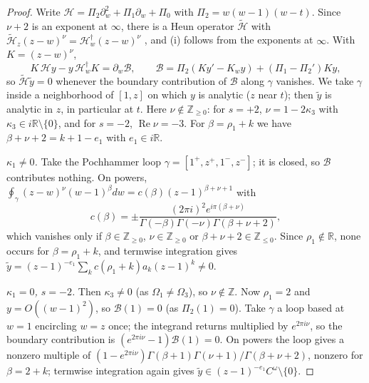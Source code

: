 \documentclass[11pt]{amsart}
\theoremstyle{definition}
\theoremstyle{remark}
\numberwithin{equation}{section}
\newcommand{\R}{\mathbb{R}}
\newcommand{\Z}{\mathbb{Z}}
\renewcommand{\Re}{\operatorname{Re}}
\begin{document}
\begin{proof}
Write $\mathcal H=\Pi_2\partial_w^2+\Pi_1\partial_w+\Pi_0$ with $\Pi_2=w(w-1)(w-t)$. Since $\nu+2$ is an exponent at $\infty$, there
is a Heun operator $\widetilde{\mathcal H}$ with $\widetilde{\mathcal H}_z(z-w)^\nu=\mathcal H_w^\dagger(z-w)^\nu$
\cite{KS96,Tak03}, and (i) follows from the exponents at $\infty$. With $K=(z-w)^\nu$,
\[
K\,\mathcal Hy-y\,\mathcal H_w^\dagger K=\partial_w\mathcal B,\qquad\mathcal B=\Pi_2(Ky'-K_wy)+(\Pi_1-\Pi_2')Ky,
\]
so $\widetilde{\mathcal H}\tilde y=0$ whenever the boundary contribution of $\mathcal B$ along $\gamma$ vanishes. We
take $\gamma$ inside a neighborhood of $[1,z]$ on which $y$ is analytic ($z$ near $t$); then $\tilde y$ is analytic in
$z$, in particular at $t$. Here $\nu\notin\Z_{\ge0}$: for $s=+2$, $\nu=1-2\kappa_3$ with
$\kappa_3\in i\R\setminus\{0\}$, and for $s=-2$, $\Re\nu=-3$. For $\beta=\rho_1+k$ we have $\beta+\nu+2=k+1-e_1$ with
$e_1\in i\R$.

\emph{$\kappa_1\ne0$.} Take the Pochhammer loop $\gamma=[1^+,z^+,1^-,z^-]$; it is closed, so $\mathcal B$ contributes
nothing. On powers, $\oint_\gamma(z-w)^\nu(w-1)^\beta dw=c(\beta)(z-1)^{\beta+\nu+1}$ with
\[
c(\beta)=\pm\frac{(2\pi i)^2e^{i\pi(\beta+\nu)}}{\Gamma(-\beta)\Gamma(-\nu)\Gamma(\beta+\nu+2)},
\]
which vanishes only if
$\beta\in\Z_{\ge0}$, $\nu\in\Z_{\ge0}$ or $\beta+\nu+2\in\Z_{\le0}$. Since $\rho_1\notin\R$, none occurs for
$\beta=\rho_1+k$, and termwise integration gives $\tilde y=(z-1)^{-e_1}\sum_kc(\rho_1+k)a_k(z-1)^k\ne0$.

\emph{$\kappa_1=0$, $s=-2$.} Then $\kappa_3\ne0$ (as $\Omega_1\ne\Omega_3$), so $\nu\notin\Z$. Now $\rho_1=2$ and $y=O((w-1)^2)$, so $\mathcal B(1)=0$ (as $\Pi_2(1)=0$). Take $\gamma$ a
loop based at $w=1$ encircling $w=z$ once; the integrand returns multiplied by $e^{2\pi i\nu}$, so the boundary
contribution is $(e^{2\pi i\nu}-1)\mathcal B(1)=0$. On powers the loop gives a nonzero multiple of
$(1-e^{2\pi i\nu})\Gamma(\beta+1)\Gamma(\nu+1)/\Gamma(\beta+\nu+2)$, nonzero for $\beta=2+k$; termwise integration again
gives $\tilde y\in(z-1)^{-e_1}C^\omega\setminus\{0\}$.
\end{proof}
\end{document}

